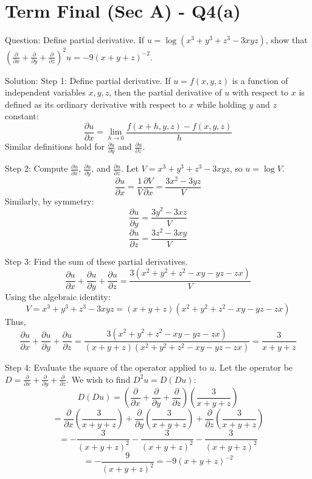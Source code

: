 \documentclass[11pt, a4paper]{article}
\begin{document}
\section*{Term Final (Sec A) - Q4(a)}
Question:
Define partial derivative. If $u = \log(x^3 + y^3 + z^3 - 3xyz)$, show that $\left(\frac{\partial}{\partial x} + \frac{\partial}{\partial y} + \frac{\partial}{\partial z}\right)^2 u = -9(x+y+z)^{-2}$.

Solution:
Step 1: Define partial derivative.
If $u = f(x, y, z)$ is a function of independent variables $x, y, z$, then the partial derivative of $u$ with respect to $x$ is defined as its ordinary derivative with respect to $x$ while holding $y$ and $z$ constant:
$$\frac{\partial u}{\partial x} = \lim_{h \to 0} \frac{f(x+h, y, z) - f(x, y, z)}{h}$$
Similar definitions hold for $\frac{\partial u}{\partial y}$ and $\frac{\partial u}{\partial z}$.

Step 2: Compute $\frac{\partial u}{\partial x}$, $\frac{\partial u}{\partial y}$, and $\frac{\partial u}{\partial z}$.
Let $V = x^3 + y^3 + z^3 - 3xyz$, so $u = \log V$.
$$\frac{\partial u}{\partial x} = \frac{1}{V} \frac{\partial V}{\partial x} = \frac{3x^2 - 3yz}{V}$$
Similarly, by symmetry:
$$\frac{\partial u}{\partial y} = \frac{3y^2 - 3xz}{V}$$
$$\frac{\partial u}{\partial z} = \frac{3z^2 - 3xy}{V}$$

Step 3: Find the sum of these partial derivatives.
$$\frac{\partial u}{\partial x} + \frac{\partial u}{\partial y} + \frac{\partial u}{\partial z} = \frac{3(x^2 + y^2 + z^2 - xy - yz - zx)}{V}$$
Using the algebraic identity:
$$V = x^3 + y^3 + z^3 - 3xyz = (x + y + z)(x^2 + y^2 + z^2 - xy - yz - zx)$$
Thus,
$$\frac{\partial u}{\partial x} + \frac{\partial u}{\partial y} + \frac{\partial u}{\partial z} = \frac{3(x^2 + y^2 + z^2 - xy - yz - zx)}{(x + y + z)(x^2 + y^2 + z^2 - xy - yz - zx)} = \frac{3}{x+y+z}$$

Step 4: Evaluate the square of the operator applied to $u$.
Let the operator be $D = \frac{\partial}{\partial x} + \frac{\partial}{\partial y} + \frac{\partial}{\partial z}$. We wish to find $D^2 u = D(Du)$:
$$D(Du) = \left(\frac{\partial}{\partial x} + \frac{\partial}{\partial y} + \frac{\partial}{\partial z}\right) \left(\frac{3}{x+y+z}\right)$$
$$= \frac{\partial}{\partial x}\left(\frac{3}{x+y+z}\right) + \frac{\partial}{\partial y}\left(\frac{3}{x+y+z}\right) + \frac{\partial}{\partial z}\left(\frac{3}{x+y+z}\right)$$
$$= -\frac{3}{(x+y+z)^2} - \frac{3}{(x+y+z)^2} - \frac{3}{(x+y+z)^2}$$
$$= -\frac{9}{(x+y+z)^2} = -9(x+y+z)^{-2}$$
\end{document}
